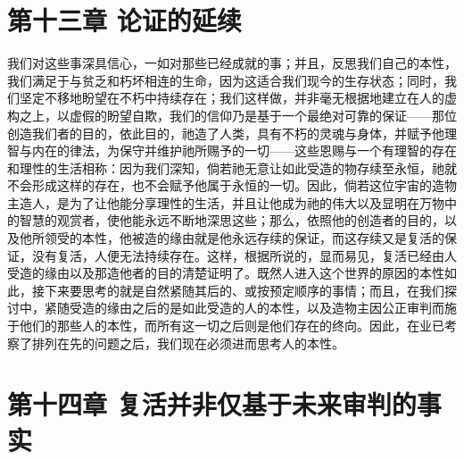 
\section{第十三章 论证的延续}

我们对这些事深具信心，一如对那些已经成就的事；并且，反思我们自己的本性，我们满足于与贫乏和朽坏相连的生命，因为这适合我们现今的生存状态；同时，我们坚定不移地盼望在不朽中持续存在；我们这样做，并非毫无根据地建立在人的虚构之上，以虚假的盼望自欺，我们的信仰乃是基于一个最绝对可靠的保证——那位创造我们者的目的，依此目的，祂造了人类，具有不朽的灵魂与身体，并赋予他理智与内在的律法，为保守并维护祂所赐予的一切——这些恩赐与一个有理智的存在和理性的生活相称：因为我们深知，倘若祂无意让如此受造的物存续至永恒，祂就不会形成这样的存在，也不会赋予他属于永恒的一切。因此，倘若这位宇宙的造物主造人，是为了让他能分享理性的生活，并且让他成为祂的伟大以及显明在万物中的智慧的观赏者，使他能永远不断地深思这些；那么，依照他的创造者的目的，以及他所领受的本性，他被造的缘由就是他永远存续的保证，而这存续又是复活的保证，没有复活，人便无法持续存在。这样，根据所说的，显而易见，复活已经由人受造的缘由以及那造他者的目的清楚证明了。既然人进入这个世界的原因的本性如此，接下来要思考的就是自然紧随其后的、或按预定顺序的事情；而且，在我们探讨中，紧随受造的缘由之后的是如此受造的人的本性，以及造物主因公正审判而施于他们的那些人的本性，而所有这一切之后则是他们存在的终向。因此，在业已考察了排列在先的问题之后，我们现在必须进而思考人的本性。\par


\section{第十四章 复活并非仅基于未来审判的事实}

